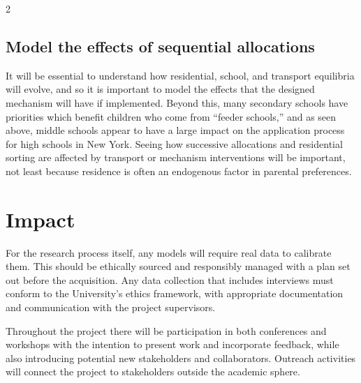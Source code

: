 \documentclass{article}
\begin{document}
\begin{multicols}{2}
\subsection{Model the effects of sequential allocations}
It will be essential to understand how residential, school, and transport equilibria will evolve, and so it is important to model the effects that the designed mechanism will have if implemented. Beyond this, many secondary schools have priorities which benefit children who come from \enquote{feeder schools,} and as seen above, middle schools appear to have a large impact on the application process for high schools in New York. Seeing how successive allocations and residential sorting are affected by transport or mechanism interventions will be important, not least because residence is often an endogenous factor in parental preferences.


\section{Impact}
For the research process itself, any models will require real data to calibrate them. This should be ethically sourced and responsibly managed with a plan set out before the acquisition. Any data collection that includes interviews must conform to the University's ethics framework, with appropriate documentation and communication with the project supervisors.

Throughout the project there will be participation in both conferences and workshops with the intention to present work and incorporate feedback, while also introducing potential new stakeholders and collaborators. Outreach activities will connect the project to stakeholders outside the academic sphere.


\end{multicols}
\end{document}
